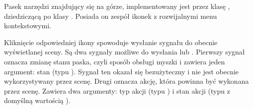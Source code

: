 \label{sec:sokar-dicomtoolbar}
\par
Pasek narzędzi znajdujący się na górze, implementowany jest przez klasę , dziedziczącą po klasy .
Posiada on zespół ikonek z rozwijalnymi menu kontekstowymi.

\par
Kliknięcie odpowiedniej ikony spowoduje wysłanie sygnału do obecnie wyświetlanej sceny.
Są dwa sygnały możliwe do wysłania  lub .
Pierwszy sygnał oznacza zmianę stanu paska, czyli sposób obsługi myszki i zawiera jeden argument: stan (typu ).
Sygnał ten okazał się bezużyteczny i nie jest obecnie wykorzystywany przez scenę.
Drugi oznacza akcję, która powinna być wykonana przez scenę.
Zawiera dwa argumenty: typ akcji (typu ) i stan akcji (typu  z domyślną wartością ).

